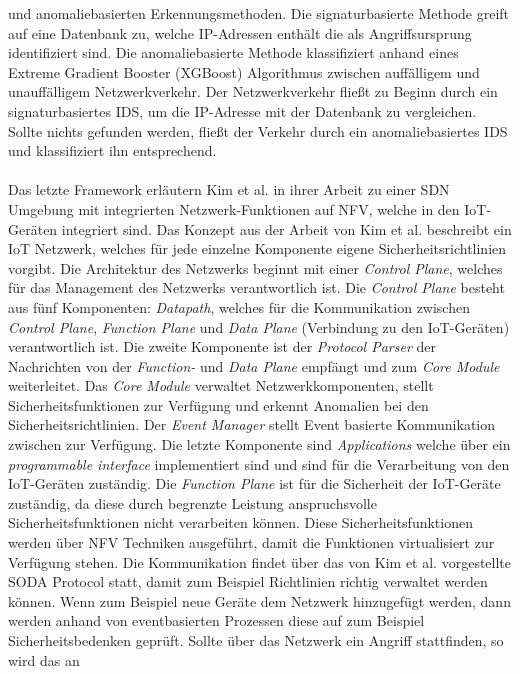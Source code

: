 und anomaliebasierten Erkennungsmethoden. Die signaturbasierte Methode greift auf eine Datenbank zu, welche IP-Adressen enthält die als Angriffsursprung identifiziert sind. Die anomaliebasierte Methode 
klassifiziert anhand eines Extreme Gradient Booster (XGBoost) Algorithmus \cite{DBLP:journals/corr/ChenG16} zwischen auffälligem und unauffälligem Netzwerkverkehr. Der Netzwerkverkehr fließt zu Beginn 
durch ein signaturbasiertes IDS, um die IP-Adresse mit der Datenbank zu vergleichen. Sollte nichts gefunden werden, fließt der Verkehr durch ein anomaliebasiertes IDS und klassifiziert ihn entsprechend.
\\ \\ Das letzte Framework erläutern Kim et al. \cite{DBLP:journals/cn/KimNPSS19} in ihrer Arbeit zu einer SDN Umgebung mit integrierten Netzwerk-Funktionen auf NFV, welche in den IoT-Geräten integriert
sind. Das Konzept aus der Arbeit von Kim et al. beschreibt ein IoT Netzwerk, welches für jede einzelne Komponente eigene Sicherheitsrichtlinien vorgibt. Die Architektur des Netzwerks beginnt mit einer
\textit{Control Plane}, welches für das Management des Netzwerks verantwortlich ist. Die \textit{Control Plane} besteht aus fünf Komponenten: \textit{Datapath}, welches für die Kommunikation zwischen 
\textit{Control Plane}, \textit{Function Plane} und \textit{Data Plane} (Verbindung zu den IoT-Geräten) verantwortlich ist. Die zweite Komponente ist der \textit{Protocol Parser} der Nachrichten von der 
\textit{Function-} und \textit{Data Plane} empfängt und zum \textit{Core Module} weiterleitet. Das \textit{Core Module} verwaltet Netzwerkkomponenten, stellt 
Sicherheitsfunktionen zur Verfügung und erkennt Anomalien bei den Sicherheitsrichtlinien. Der \textit{Event Manager} stellt Event basierte Kommunikation zwischen zur Verfügung. Die letzte Komponente sind 
\textit{Applications} welche über ein \textit{programmable interface} implementiert sind und sind für die Verarbeitung von den IoT-Geräten zuständig. Die \textit{Function Plane} ist für die Sicherheit der 
IoT-Geräte zuständig, da diese durch begrenzte Leistung anspruchsvolle Sicherheitsfunktionen nicht verarbeiten können. Diese Sicherheitsfunktionen werden über NFV Techniken ausgeführt, damit die Funktionen 
virtualisiert zur Verfügung stehen. Die Kommunikation findet über das von Kim et al. vorgestellte SODA Protocol statt, damit zum Beispiel Richtlinien richtig verwaltet werden können. Wenn zum Beispiel neue 
Geräte dem Netzwerk hinzugefügt werden, dann werden anhand von eventbasierten Prozessen diese auf zum Beispiel Sicherheitsbedenken geprüft. Sollte über das Netzwerk ein Angriff stattfinden, so wird das an 
